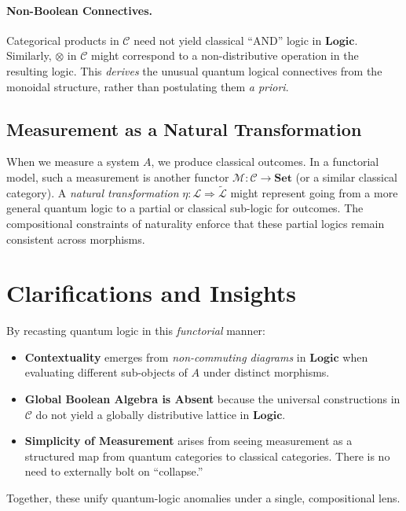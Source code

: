 \documentclass[12pt]{article}
\begin{document}
\paragraph{Non-Boolean Connectives.}  
Categorical products in $\mathcal{C}$ need not yield classical ``AND'' logic in $\mathbf{Logic}$. Similarly, $\otimes$ in $\mathcal{C}$ might correspond to a non-distributive operation in the resulting logic. This \emph{derives} the unusual quantum logical connectives from the monoidal structure, rather than postulating them \emph{a priori}.

\subsection{Measurement as a Natural Transformation}
When we measure a system $A$, we produce classical outcomes. In a functorial model, such a measurement is another functor $\mathcal{M}: \mathcal{C} \to \mathbf{Set}$ (or a similar classical category). A \emph{natural transformation} $\eta: \mathcal{L} \Rightarrow \tilde{\mathcal{L}}$ might represent going from a more general quantum logic to a partial or classical sub-logic for outcomes. The compositional constraints of naturality enforce that these partial logics remain consistent across morphisms. 

\vspace{1em}

\section{Clarifications and Insights}
By recasting quantum logic in this \emph{functorial} manner:
\begin{itemize}[label=$\diamond$]
    \item \textbf{Contextuality} emerges from \emph{non-commuting diagrams} in $\mathbf{Logic}$ when evaluating different sub-objects of $A$ under distinct morphisms. 
    \item \textbf{Global Boolean Algebra is Absent} because the universal constructions in $\mathcal{C}$ do not yield a globally distributive lattice in $\mathbf{Logic}$. 
    \item \textbf{Simplicity of Measurement} arises from seeing measurement as a structured map from quantum categories to classical categories. There is no need to externally bolt on ``collapse.''
\end{itemize}
Together, these unify quantum-logic anomalies under a single, compositional lens.
\end{document}
